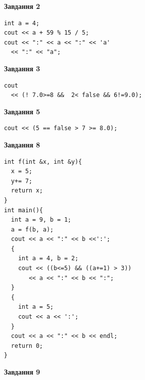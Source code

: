 \documentclass[12pt, ukrainian]{article}
\begin{document}
{\begin {large}
\begin{minipage}[t]{7.0cm}
\end{minipage}
\vline \hspace{1mm}
\begin{minipage}[t]{11.0cm}

\begin{center}
\textbf{Завдання 2}
\end{center}
\vspace{-8mm}

\begin{verbatim}
int a = 4;
cout << a + 59 % 15 / 5;
cout << ":" << a << ":" << 'a' 
  << ":" << "a";
\end{verbatim}



\begin{center}
\textbf{Завдання 3}
\end{center}
\vspace{-8mm}

\begin{verbatim}
cout 
  << (! 7.0>=8 &&  2< false && 6!=9.0);
\end{verbatim}



\begin{center}
\textbf{Завдання 5}
\end{center}
\vspace{-8mm}

\begin{verbatim}
cout << (5 == false > 7 >= 8.0);
\end{verbatim}



\begin{center}
\textbf{Завдання 8}
\end{center}
\vspace{-8mm}

\begin{verbatim}
int f(int &x, int &y){
  x = 5;
  y+= 7;
  return x;
}
int main(){
  int a = 9, b = 1;
  a = f(b, a);
  cout << a << ":" << b <<':';
  {
    int a = 4, b = 2;
    cout << ((b<=5) && ((a+=1) > 3))
       << a << ":" << b << ":";
  }
  {
    int a = 5;
    cout << a << ':';
  }
  cout << a << ":" << b << endl;
  return 0;
}
\end{verbatim}

\end{minipage}


\begin{minipage}[t]{7.0cm}

\begin{center}
\textbf{Завдання 9}
\end{center}
\vspace{-8mm}


\end{minipage}
\end{large}}
\end{document}
